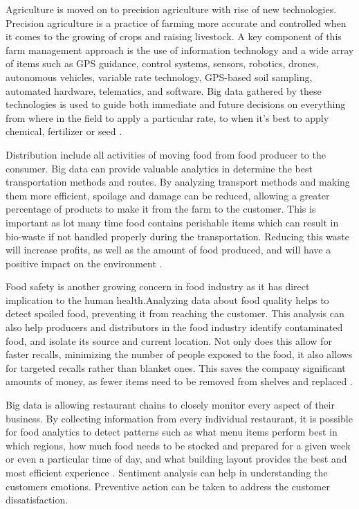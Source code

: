 \documentclass[sigconf]{acmart}
\begin{document}
Agriculture is moved on to precision agriculture with rise of new technologies. Precision agriculture is a practice of farming more accurate and controlled when it comes to the growing of crops and raising livestock.  A key component of this farm management approach is the use of information technology and a wide array of items such as GPS guidance, control systems, sensors, robotics, drones, autonomous vehicles, variable rate technology, GPS-based soil sampling, automated hardware, telematics, and software. Big data gathered by these technologies is used to guide both immediate and future decisions on everything from where in the field to apply a particular rate, to when it’s best to apply chemical, fertilizer or seed \cite{remi}.

Distribution include all activities of moving food from food producer to the consumer. Big data can provide valuable analytics in determine the best transportation methods and routes. By analyzing transport methods and making them more efficient, spoilage and damage can be reduced, allowing a greater percentage of products to make it from the farm to the customer. This is important as lot many time food contains perishable items which can result in bio-waste if not handled properly during the transportation. Reducing this waste will increase profits, as well as the amount of food produced, and will have a positive impact on the environment \cite{www-quantzig}.

Food safety is another growing concern in food industry as it has direct implication to the human health.Analyzing data about food quality helps to detect spoiled food, preventing it from reaching the customer. This analysis can also help producers and distributors in the food industry identify contaminated food, and isolate its source and current location. Not only does this allow for faster recalls, minimizing the number of people exposed to the food, it also allows for targeted recalls rather than blanket ones. This saves the company significant amounts of money, as fewer items need to be removed from shelves and replaced \cite{www-quantzig}.

Big data is allowing restaurant chains to closely monitor every aspect of their business. By collecting information from every individual restaurant, it is possible for food analytics to detect patterns such as what menu items perform best in which regions, how much food needs to be stocked and prepared for a given week or even a particular time of day, and what building layout provides the best and most efficient experience \cite{www-quantzig}. Sentiment analysis can help in understanding the customers emotions. Preventive action can be taken to address the customer dissatisfaction. 
\end{document}
